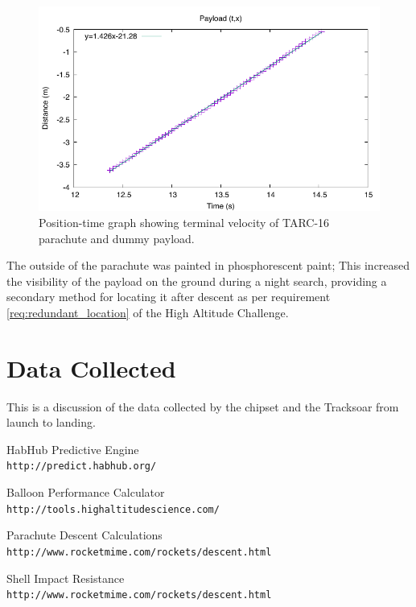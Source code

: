 \documentclass[english]{report}
\begin{document}

\begin{figure}
\begin{centering}
\includegraphics{./graphs/parachute-derivative}
\par\end{centering}
\caption{Position-time graph showing terminal velocity of TARC-16 parachute and dummy payload.}
\label{fig:parachute-derivative}
\end{figure}

The outside of the parachute was painted in phosphorescent paint; This increased the visibility of the payload on the ground during a night search, providing a secondary method for locating it after descent as per requirement \ref{req:redundant_location} of the High Altitude Challenge.


\part{Data Collected}

This is a discussion of the data collected by the chipset and the Tracksoar from launch to landing.






\begin{thebibliography}{9}

HabHub Predictive Engine
\\\texttt{http://predict.habhub.org/}

Balloon Performance Calculator
\\\texttt{http://tools.highaltitudescience.com/}

Parachute Descent Calculations
\\\texttt{http://www.rocketmime.com/rockets/descent.html}

Shell Impact Resistance
\\\texttt{http://www.rocketmime.com/rockets/descent.html}
\end{thebibliography}
\end{document}
